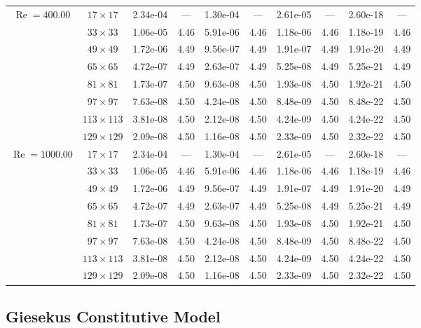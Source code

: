 \documentclass[preprint, 12pt]{elsarticle}
\begin{document}
{\begin{center}
\begin{table}[H]
{\begin{tabular*}{\textwidth}{@{\extracolsep\fill}cccccccccc@{}}
    \hline
    \multirow{7}{*}{$\operatorname{Re}=400.00$} & $17\times 17$ & 2.34e-04 & --- & 1.30e-04 & --- & 2.61e-05 & --- & 2.60e-18 & --- \\
    & $33\times 33$ & 1.06e-05 & 4.46 & 5.91e-06 & 4.46 & 1.18e-06 & 4.46 & 1.18e-19 & 4.46 \\
    & $49\times 49$ & 1.72e-06 & 4.49 & 9.56e-07 & 4.49 & 1.91e-07 & 4.49 & 1.91e-20 & 4.49 \\
    \multirow{3}{*}{$\operatorname{Wi}=10$} & $65\times 65$ & 4.72e-07 & 4.49 & 2.63e-07 & 4.49 & 5.25e-08 & 4.49 & 5.25e-21 & 4.49 \\
    & $81\times 81$ & 1.73e-07 & 4.50 & 9.63e-08 & 4.50 & 1.93e-08 & 4.50 & 1.92e-21 & 4.50 \\
    & $97\times 97$ & 7.63e-08 & 4.50 & 4.24e-08 & 4.50 & 8.48e-09 & 4.50 & 8.48e-22 & 4.50 \\
    & $113\times 113$ & 3.81e-08 & 4.50 & 2.12e-08 & 4.50 & 4.24e-09 & 4.50 & 4.24e-22 & 4.50 \\
    & $129\times 129$ & 2.09e-08 & 4.50 & 1.16e-08 & 4.50 & 2.33e-09 & 4.50 & 2.32e-22 & 4.50 \\
    \hline
    \multirow{7}{*}{$\operatorname{Re}=1000.00$} & $17\times 17$ & 2.34e-04 & --- & 1.30e-04 & --- & 2.61e-05 & --- & 2.60e-18 & --- \\
    & $33\times 33$ & 1.06e-05 & 4.46 & 5.91e-06 & 4.46 & 1.18e-06 & 4.46 & 1.18e-19 & 4.46 \\
    & $49\times 49$ & 1.72e-06 & 4.49 & 9.56e-07 & 4.49 & 1.91e-07 & 4.49 & 1.91e-20 & 4.49 \\
    \multirow{3}{*}{$\operatorname{Wi}=10$} & $65\times 65$ & 4.72e-07 & 4.49 & 2.63e-07 & 4.49 & 5.25e-08 & 4.49 & 5.25e-21 & 4.49 \\
    & $81\times 81$ & 1.73e-07 & 4.50 & 9.63e-08 & 4.50 & 1.93e-08 & 4.50 & 1.92e-21 & 4.50 \\
    & $97\times 97$ & 7.63e-08 & 4.50 & 4.24e-08 & 4.50 & 8.48e-09 & 4.50 & 8.48e-22 & 4.50 \\
    & $113\times 113$ & 3.81e-08 & 4.50 & 2.12e-08 & 4.50 & 4.24e-09 & 4.50 & 4.24e-22 & 4.50 \\
    & $129\times 129$ & 2.09e-08 & 4.50 & 1.16e-08 & 4.50 & 2.33e-09 & 4.50 & 2.32e-22 & 4.50 \\
    \hline
    \end{tabular*}
}
\end{table}
\end{center}

\subsection{Giesekus Constitutive Model}
\label{Appendix_more_wi_giesekus}

}
\end{document}

